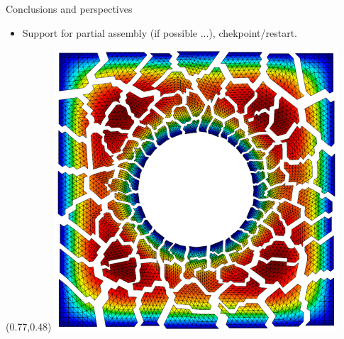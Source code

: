 \documentclass{beamer}
\begin{document}
\begin{frame}{Conclusions and perspectives}
{\begin{minipage}{1.1\textwidth}
\begin{itemize}
\begin{itemize}
      MFront and MGIS side).
      \item Support for partial assembly (if possible ...),
      chekpoint/restart.
    \end{itemize}
  \end{itemize}
    \end{minipage}}
  \begin{textblock}{.20}(0.77,0.48)
  \includegraphics[width=.94\textwidth]{img/ex1p-np100.png}
  \end{textblock}
\end{frame}    
\end{document}
